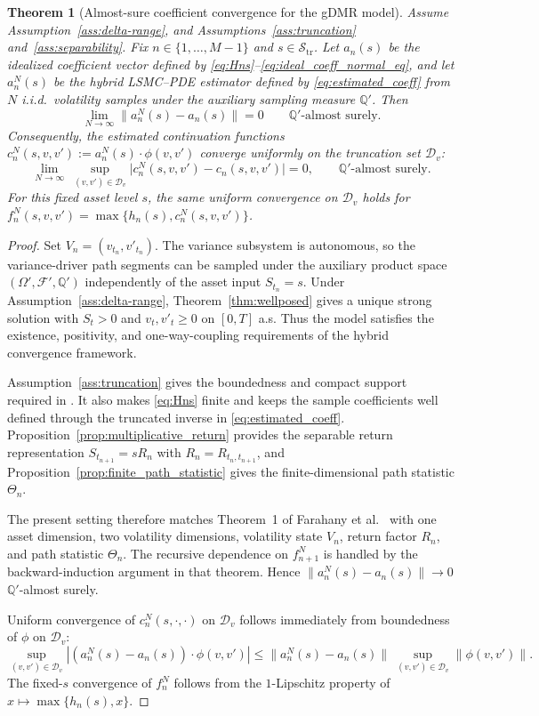 \documentclass[pdflatex,sn-mathphys-num]{sn-jnl}
\theoremstyle{thmstyleone}%
\newtheorem{theorem}{Theorem}[section]
\theoremstyle{thmstylethree}%
\theoremstyle{thmstyletwo}%
\begin{document}
\begin{theorem}[Almost-sure coefficient convergence for the gDMR model]
\label{thm:as_coeff_convergence}
Assume Assumption~\ref{ass:delta-range}, and Assumptions~\ref{ass:truncation}
and~\ref{ass:separability}. Fix $n\in\{1,\dots,M-1\}$ and $s\in\mathcal S_{\mathrm{tr}}$.
Let $a_n(s)$ be the idealized coefficient vector defined by \eqref{eq:Hns}--\eqref{eq:ideal_coeff_normal_eq}, and let
$a_n^N(s)$ be the hybrid LSMC--PDE estimator defined by \eqref{eq:estimated_coeff} from $N$ i.i.d.\ volatility samples
under the auxiliary sampling measure $\mathbb{Q}'$.
Then
\[
\lim_{N\to\infty} \bigl\|a_n^N(s)-a_n(s)\bigr\| = 0
\qquad \mathbb{Q}'\text{-almost surely}.
\]
Consequently, the estimated continuation functions
$c_n^N(s,v,v') := a_n^N(s)\cdot\phi(v,v')$ converge \emph{uniformly} on the truncation set $\mathcal{D}_v$:
\[
\lim_{N\to\infty}\ \sup_{(v,v')\in\mathcal{D}_v}
\bigl|c_n^N(s,v,v')-c_n(s,v,v')\bigr| = 0,
\qquad \mathbb{Q}'\text{-almost surely}.
\]
For this fixed asset level $s$, the same uniform convergence on $\mathcal D_v$ holds for
$f_n^N(s,v,v')=\max\{h_n(s),c_n^N(s,v,v')\}$.
\end{theorem}

\begin{proof}
Set $V_n=(v_{t_n},v'_{t_n})$. The variance subsystem is autonomous, so the variance-driver path segments can be
sampled under the auxiliary product space $(\Omega',\mathcal F',\mathbb Q')$ independently of the asset input
$S_{t_n}=s$. Under Assumption~\ref{ass:delta-range}, Theorem~\ref{thm:wellposed} gives a unique strong solution
with $S_t>0$ and $v_t,v'_t\ge0$ on $[0,T]$ a.s. Thus the model satisfies the existence, positivity, and
one-way-coupling requirements of the hybrid convergence framework.

Assumption~\ref{ass:truncation} gives the boundedness and compact support required in
\cite{farahany2020mixing}. It also makes \eqref{eq:Hns} finite and keeps the sample coefficients well defined
through the truncated inverse in \eqref{eq:estimated_coeff}. Proposition~\ref{prop:multiplicative_return}
provides the separable return representation $S_{t_{n+1}}=sR_n$ with $R_n=R_{t_n,t_{n+1}}$, and
Proposition~\ref{prop:finite_path_statistic} gives the finite-dimensional path statistic $\Theta_n$.

The present setting therefore matches Theorem~1 of Farahany et al.~\cite{farahany2020mixing} with one asset
dimension, two volatility dimensions, volatility state $V_n$, return factor $R_n$, and path statistic
$\Theta_n$. The recursive dependence on $f_{n+1}^N$ is handled by the backward-induction argument in that
theorem. Hence $\|a_n^N(s)-a_n(s)\|\to0$ $\mathbb Q'$-almost surely.

Uniform convergence of $c_n^N(s,\cdot,\cdot)$ on $\mathcal{D}_v$ follows immediately from boundedness of $\phi$ on $\mathcal{D}_v$:
\[
\sup_{(v,v')\in\mathcal{D}_v} |(a_n^N(s)-a_n(s))\cdot\phi(v,v')|
\le \|a_n^N(s)-a_n(s)\|\ \sup_{(v,v')\in\mathcal{D}_v}\|\phi(v,v')\|.
\]
The fixed-$s$ convergence of $f_n^N$ follows from the $1$-Lipschitz property of
$x\mapsto \max\{h_n(s),x\}$.
\end{proof}
\end{document}
